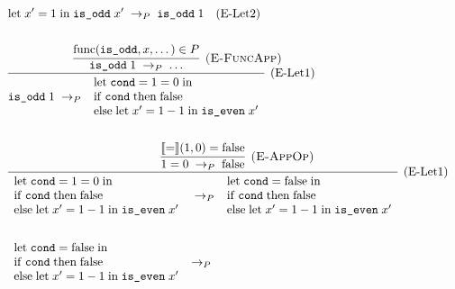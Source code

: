 \begin{align*}
{{    }
  } \\\\
  & \Reduce{P}
      {\Let{\; x'}{1\;}{\; \App{\code{is\_odd}}{x'}}}
      {\App{\code{is\_odd}}{1}} \quad\ERuleLetSubst \\\\
  & \infer[\ERuleLetCtx] {
    \Reduce{P}
      {\App{\code{is\_odd}}{1}}
      {\begin{array}{l}
          \Let
            {\; \code{cond}}{1=0 \;}
            {\\ \If
              {\; \code{cond} \;}{\; \false \\}
              {\; \Let
                {\; x'}{1-1 \;}
                {\; \App{\code{is\_even}}{x'}}}}
      \end{array}}
  } {
    \infer[\ERuleAppFunc] {
      \Reduce{P}
        {\App{\code{is\_odd}}{1}}
        {\dots}
    } {
      \Func{\code{is\_odd}}{x}{\dots} \in P
    }
  } \\\\
  & \infer[\ERuleLetCtx] {
    \Reduce{P}
      {\begin{array}{l}
        \Let
          {\; \code{cond}}{1=0 \;}
          {\\ \If
                {\; \code{cond} \;}
                {\; \false \\}
                {\; \Let{\; x'}{1-1 \;}{\; \App{\code{is\_even}}{x'\; }}}}
      \end{array}}
      {\begin{array}{l}
        \Let
          {\; \code{cond}}{\false \;}
          {\\ \If
                {\; \code{cond} \;}
                {\; \false \\}
                {\; \Let{\; x'}{1-1 \;}{\; \App{\code{is\_even}}{x'}}}}
      \end{array}}
  } {
    \infer[\ERuleAppOp] {
      \Reduce{P}{1=0}{\false}
    } {
      \sem{=}\paren{1, 0} = \false
    }
  } \\\\
  & \Reduce{P}
      {\begin{array}{l}
        \Let
          {\; \code{cond}}{\false \;}
          {\\ \If
                {\; \code{cond} \;}
                {\; \false \\}
                {\; \Let{\; x'}{1-1 \;}{\; \App{\code{is\_even}}{x'}}}}
      \end{array}}
      {\begin{array}{l}

\end{array}}
\end{align*}
